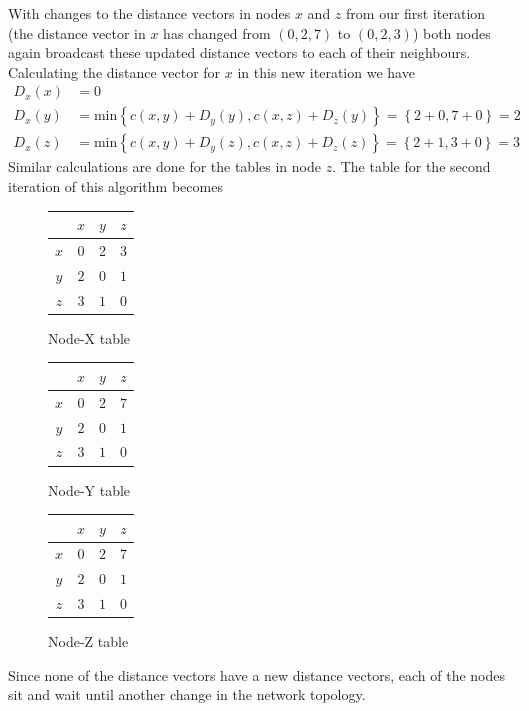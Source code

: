 \documentclass{article}
\begin{document}
With changes to the distance vectors in nodes $x$ and $z$ from our first iteration (the distance vector in $x$ has changed from $\left( 0,2,7 \right)$ to $\left( 0,2,3 \right)$) both nodes again broadcast these updated distance vectors to each of their neighbours. Calculating the distance vector for $x$ in this new iteration we have
\begin{align*}
    D_{x} (x) &= 0 \\
    D_{x} (y) &= \text{min} \left\{ c(x,y) + D_{y}(y), c(x,z) + D_{z}(y) \right\} = \left\{ 2 + 0, 7 + 0 \right\} = 2 \\
    D_{x} (z) &= \text{min} \left\{ c(x,y) + D_{y}(z), c(x,z) + D_{z}(z) \right\} = \left\{ 2 + 1, 3 + 0 \right\} = 3
\end{align*}
Similar calculations are done for the tables in node $z$. The table for the second iteration of this algorithm becomes
\begin{figure}[!htb]
   \begin{minipage}{0.3\textwidth}
    \centering
     \begin{tabular}{ c | ccc } 
        \, & $x$ & $y$ & $z$ \\
        \hline
        $x$ & 0 & 2 & 3 \\
        $y$ & $2$ & $0$ & $1$ \\
        $z$ & $3$ & $1$ & $0$ \\
    \end{tabular}
    \caption*{Node-X table}
   \end{minipage}
   \begin{minipage}{0.3\textwidth}
    \centering
     \begin{tabular}{ c | ccc } 
        \, & $x$ & $y$ & $z$ \\
        \hline
        $x$ & $0$ & $2$ & $7$ \\
        $y$ & $2$ & $0$ & $1$ \\
        $z$ & $3$ & $1$ & $0$ \\
    \end{tabular}
    \caption*{Node-Y table}
   \end{minipage}
   \begin{minipage}{0.3\textwidth}
    \centering
     \begin{tabular}{ c | ccc } 
        \, & $x$ & $y$ & $z$ \\
        \hline
        $x$ & $0$ & $2$ & $7$ \\
        $y$ & $2$ & $0$ & $1$ \\
        $z$ & $3$ & $1$ & $0$ \\
    \end{tabular}
    \caption*{Node-Z table}
   \end{minipage}
\end{figure}
Since none of the distance vectors have a new distance vectors, each of the nodes sit and wait until another change in the network topology.
\end{document}

